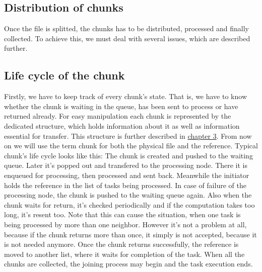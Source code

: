 \subsection{Distribution of chunks}\label{distribution-of-chunks}

Once the file is splitted, the chunks has to be distributed, processed
and finally collected. To achieve this, we must deal with several
issues, which are described further.

\subsection*{Life cycle of the chunk}

Firstly, we have to keep track of every chunk's state. That is, we have
to know whether the chunk is waiting in the queue, has been sent to
process or have returned already. For easy manipulation each chunk is
represented by the dedicated structure, which holds information about it
as well as information essential for transfer. This structure is further
described in \hyperref[implementation]{chapter 3}. From now on we will
use the term chunk for both the physical file and the reference. Typical
chunk's life cycle looks like this: The chunk is created and pushed to
the waiting queue. Later it's popped out and transfered to the
processing node. There it is enqueued for processing, then processed and
sent back. Meanwhile the initiator holds the reference in the list of
tasks being processed. In case of failure of the processing node, the
chunk is pushed to the waiting queue again. Also when the chunk waits
for return, it's checked periodically and if the computation takes too
long, it's resent too. Note that this can cause the situation, when one
task is being processed by more than one neighbor. However it's not a
problem at all, because if the chunk returns more than once, it simply
is not accepted, because it is not needed anymore. Once the chunk
returns successfully, the reference is moved to another list, where it
waits for completion of the task. When all the chunks are collected, the
joining process may begin and the task execution ends.

